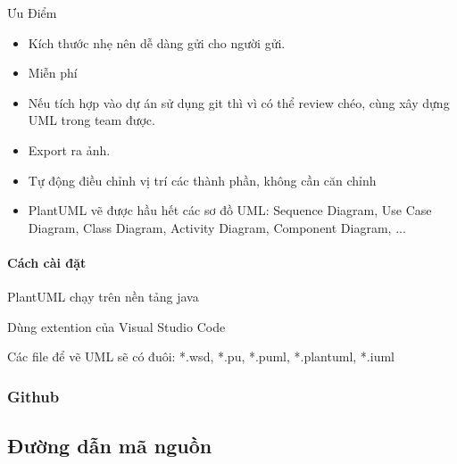Ưu Điểm
\begin{adjustwidth}{2em}{}
  \begin{itemize}
      \item Kích thước nhẹ nên dễ dàng gửi cho người gửi.
  
      \item 	Miễn phí
      \item 	Nếu tích hợp vào dự án sử dụng git thì vì có thể review chéo, cùng xây dựng UML trong team được.
      \item 	Export ra ảnh.
      \item 	Tự động điều chỉnh vị trí các thành phần, không cần căn chỉnh
      \item 	PlantUML vẽ được hầu hết các sơ đồ UML: Sequence Diagram, Use Case Diagram, Class Diagram, Activity Diagram, Component Diagram, ...
      
  \end{itemize}
\end{adjustwidth}


\paragraph{Cách cài đặt}
\mbox{}


PlantUML chạy trên nền tảng java

Dùng extention của Visual Studio Code

Các file để vẽ UML sẽ có đuôi: *.wsd, *.pu, *.puml, *.plantuml, *.iuml




\subsubsection{Github}

\subsection{Đường dẫn mã nguồn}

\clearpage